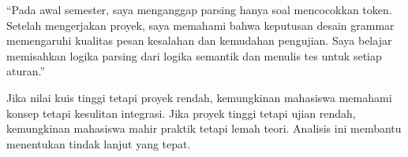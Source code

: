 \begin{contoh}
``Pada awal semester, saya menganggap parsing hanya soal mencocokkan
token. Setelah mengerjakan proyek, saya memahami bahwa keputusan
desain grammar memengaruhi kualitas pesan kesalahan dan kemudahan
pengujian. Saya belajar memisahkan logika parsing dari logika
semantik dan menulis tes untuk setiap aturan.''
\end{contoh}

\begin{contoh}
Jika nilai kuis tinggi tetapi proyek rendah, kemungkinan mahasiswa
memahami konsep tetapi kesulitan integrasi. Jika proyek tinggi
tetapi ujian rendah, kemungkinan mahasiswa mahir praktik tetapi
lemah teori. Analisis ini membantu menentukan tindak lanjut yang
tepat.
\end{contoh}
